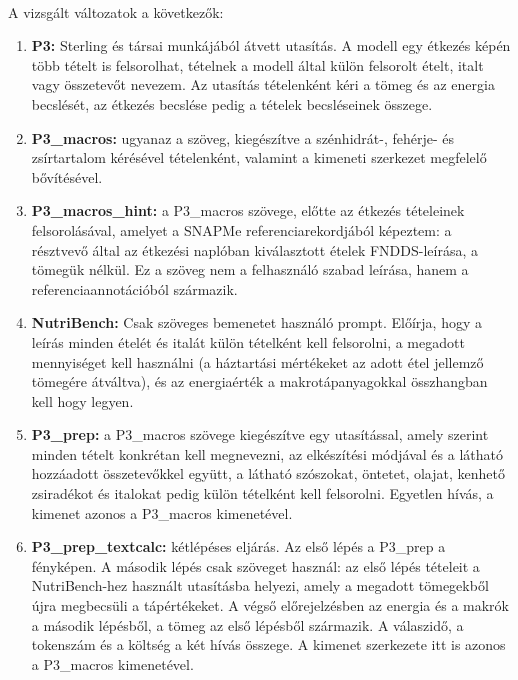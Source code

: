 \paragraph{}A vizsgált változatok a következők:
\begin{enumerate}
    \item \textbf{P3:} Sterling és társai \cite{sterling2026vlm} munkájából átvett utasítás. A modell egy étkezés képén több tételt is felsorolhat, tételnek a modell által külön felsorolt ételt, italt vagy összetevőt nevezem. Az utasítás tételenként kéri a tömeg és az energia becslését, az étkezés becslése pedig a tételek becsléseinek összege.
    \item \textbf{P3\_macros:} ugyanaz a szöveg, kiegészítve a szénhidrát-, fehérje- és
    zsírtartalom kérésével tételenként, valamint a kimeneti szerkezet megfelelő
    bővítésével.
    \item \textbf{P3\_macros\_hint:} a P3\_macros szövege, előtte az étkezés tételeinek felsorolásával, amelyet a
SNAPMe referenciarekordjából képeztem: a résztvevő által az étkezési naplóban kiválasztott ételek FNDDS-leírása,
a tömegük nélkül. Ez a szöveg nem a felhasználó szabad leírása, hanem a referenciaannotációból származik.
    \item \textbf{NutriBench:} Csak szöveges bemenetet használó prompt. Előírja, hogy a
    leírás minden ételét és italát külön tételként kell felsorolni, a megadott
    mennyiséget kell használni (a háztartási mértékeket az adott étel jellemző
    tömegére átváltva), és az energiaérték a makrotápanyagokkal összhangban kell hogy legyen.
    \item \textbf{P3\_prep:} a P3\_macros szövege kiegészítve egy utasítással, amely szerint
    minden tételt konkrétan kell megnevezni, az elkészítési módjával és a látható
    hozzáadott összetevőkkel együtt, a látható szószokat, öntetet, olajat, kenhető zsiradékot és italokat pedig
    külön tételként kell felsorolni. Egyetlen hívás, a kimenet azonos a P3\_macros
    kimenetével.
    \item \textbf{P3\_prep\_textcalc:} kétlépéses eljárás. Az első lépés a P3\_prep a
    fényképen. A második lépés csak szöveget használ: az első lépés tételeit
    a NutriBench-hez használt utasításba helyezi, amely a
    megadott tömegekből újra megbecsüli a tápértékeket. A végső előrejelzésben az
    energia és a makrók a második lépésből, a tömeg az első lépésből származik. A válaszidő, a tokenszám és a
    költség a két hívás összege. A kimenet szerkezete itt is azonos a P3\_macros
    kimenetével.

\end{enumerate}
